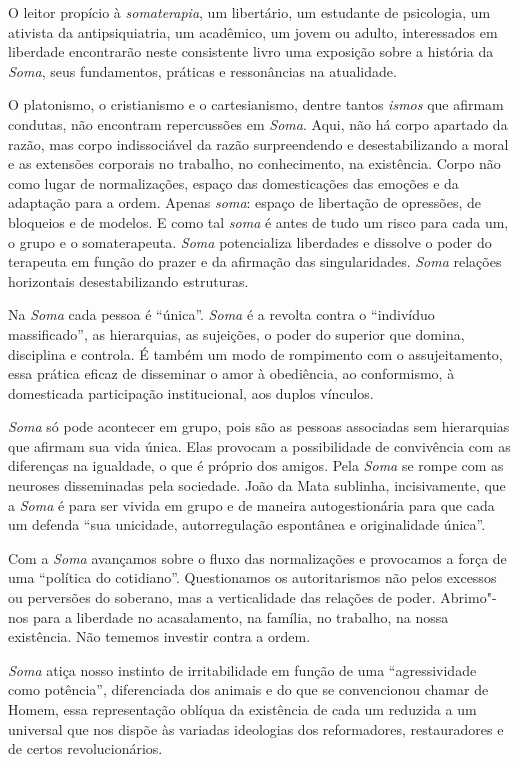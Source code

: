 O leitor propício à \emph{somaterapia}, um libertário, um estudante de
psicologia, um ativista da antipsiquiatria, um acadêmico, um jovem ou
adulto, interessados em liberdade encontrarão neste consistente livro
uma exposição sobre a história da \emph{Soma}, seus fundamentos,
práticas e ressonâncias na atualidade.

O platonismo, o cristianismo e o cartesianismo, dentre tantos
\emph{ismos} que afirmam condutas, não encontram repercussões em
\emph{Soma}. Aqui, não há corpo apartado da razão, mas corpo
indissociável da razão surpreendendo e desestabilizando a moral e as
extensões corporais no trabalho, no conhecimento, na existência. Corpo
não como lugar de normalizações, espaço das domesticações das emoções e
da adaptação para a ordem. Apenas \emph{soma}: espaço de libertação de
opressões, de bloqueios e de modelos. E como tal \emph{soma} é antes de
tudo um risco para cada um, o grupo e o somaterapeuta. \emph{Soma}
potencializa liberdades e dissolve o poder do terapeuta em função do
prazer e da afirmação das singularidades. \emph{Soma} relações
horizontais desestabilizando estruturas.

Na \emph{Soma} cada pessoa é ``única''. \emph{Soma} é a revolta contra o
``indivíduo massificado'', as hierarquias, as sujeições, o poder do
superior que domina, disciplina e controla. É também um modo de
rompimento com o assujeitamento, essa prática eficaz de disseminar o
amor à obediência, ao conformismo, à domesticada participação
institucional, aos duplos vínculos.

\emph{Soma} só pode acontecer em grupo, pois são as pessoas associadas
sem hierarquias que afirmam sua vida única. Elas provocam a
possibilidade de convivência com as diferenças na igualdade, o que é
próprio dos amigos. Pela \emph{Soma} se rompe com as neuroses
disseminadas pela sociedade. João da Mata sublinha, incisivamente, que a
\emph{Soma} é para ser vivida em grupo e de maneira autogestionária para
que cada um defenda ``sua unicidade, autorregulação espontânea e
originalidade única''.

Com a \emph{Soma} avançamos sobre o fluxo das normalizações e provocamos
a força de uma ``política do cotidiano''. Questionamos os autoritarismos
não pelos excessos ou perversões do soberano, mas a verticalidade das
relações de poder. Abrimo"-nos para a liberdade no acasalamento, na
família, no trabalho, na nossa existência. Não tememos investir contra a
ordem.

\emph{Soma} atiça nosso instinto de irritabilidade em função de uma
``agressividade como potência'', diferenciada dos animais e do que se
convencionou chamar de Homem, essa representação oblíqua da existência
de cada um reduzida a um universal que nos dispõe às variadas ideologias
dos reformadores, restauradores e de certos revolucionários.

